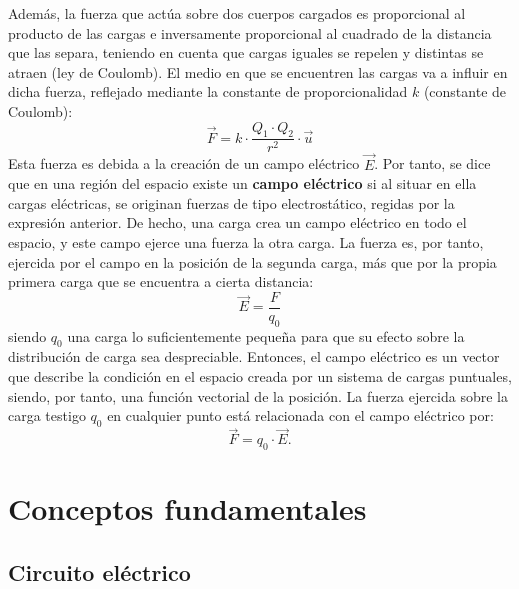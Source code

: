 \documentclass[11pt]{book} %
\begin{document}
	Además, la fuerza que actúa sobre dos cuerpos cargados es proporcional al producto de las cargas e inversamente proporcional al cuadrado de la distancia que las separa, teniendo en cuenta que cargas iguales se repelen y distintas se atraen (ley de Coulomb). El medio en que se encuentren las cargas va a influir en dicha fuerza, reflejado mediante la constante de proporcionalidad $k$ (constante de Coulomb):
	\begin{equation*}\label{eq.coulomb}
		\Vec{F}=k\cdot\dfrac{Q_1\cdot Q_2}{r^2}\cdot \Vec{u}
	\end{equation*}
	Esta fuerza es debida a la creación de un campo eléctrico $\Vec{E}$. Por tanto, se dice que en una región del espacio existe un \textbf{campo eléctrico} si al situar en ella cargas eléctricas, se originan fuerzas de tipo electrostático, regidas por la expresión anterior. De hecho, una carga crea un campo eléctrico en todo el espacio, y este campo ejerce una fuerza la otra carga. La fuerza es, por tanto, ejercida por el campo en la posición de la segunda carga, más que por la propia primera carga que se encuentra a cierta distancia:
	\begin{equation*}
		\Vec{E}=\dfrac{F}{q_0}
	\end{equation*}
	siendo $q_0$ una carga lo suficientemente pequeña para que su efecto sobre la distribución de carga sea despreciable. Entonces, el campo eléctrico es un vector que describe la condición en el espacio creada por un sistema de cargas puntuales, siendo, por tanto, una función vectorial de la posición. La fuerza ejercida sobre la carga testigo $q_0$ en cualquier punto está relacionada con el campo eléctrico por:
	\begin{equation*}
		\Vec{F}=q_0\cdot \Vec{E}.
	\end{equation*}
	
	
	\section{Conceptos fundamentales}
	
	\subsection{Circuito eléctrico} \label{sec.circuito_electrico}
	
\end{document}
